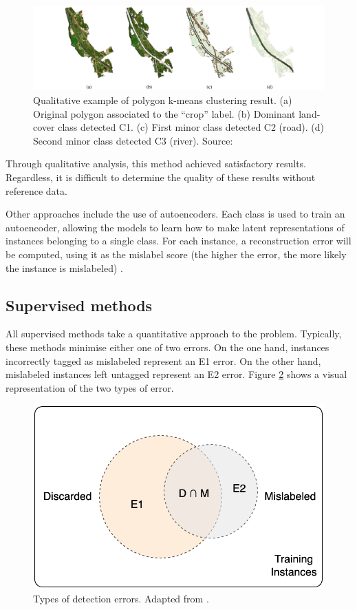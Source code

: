 \documentclass[12pt, english, openany]{book}
\begin{document}
\begin{figure}[H]
	\centering
	\includegraphics[width=1\linewidth]{paris_kmeans_results.png}
  \caption[Qualitative example of polygon k-means clustering
  result.]{Qualitative example of polygon k-means clustering result. (a)
  Original polygon associated to the “crop” label. (b) Dominant land-cover
  class detected C1. (c) First minor class detected C2 (road). (d) Second minor
  class detected C3 (river). Source: \cite{Paris2019}}
  \label{fig:paris-kmeans}
\end{figure}

Through qualitative analysis, this method achieved satisfactory results.
Regardless, it is difficult to determine the quality of these
results without reference data.

Other approaches include the use of autoencoders. Each class is used to train
an autoencoder, allowing the models to learn how to make latent representations
of instances belonging to a single class. For each instance, a reconstruction
error will be computed, using it as the mislabel score (the higher the error,
the more likely the instance is mislabeled) \cite{Zhang2019}.


\subsection*{Supervised methods}

All supervised methods take a quantitative approach to the problem.
Typically, these methods minimise either one of two errors. On the one hand,
instances incorrectly tagged as mislabeled represent an E1 error. On the other
hand, mislabeled instances left untagged represent an E2 error. Figure
\ref{fig:types-detection-errors} shows a visual representation of the two types
of error.

\begin{figure}[H]
	\centering
	\includegraphics[width=.6\linewidth]{detection_errors_types.png}
  \caption[Types of detection errors.]{Types of detection errors. Adapted from
  \cite{Brodley1999}.}
  \label{fig:types-detection-errors}
\end{figure}
\end{document}
